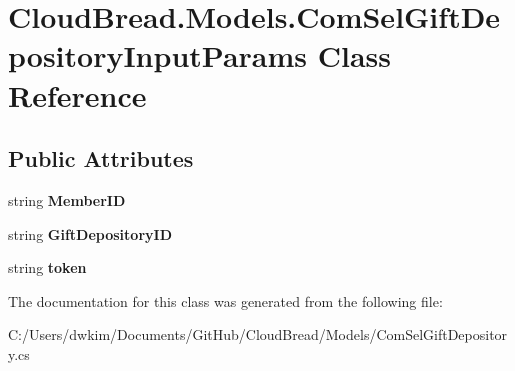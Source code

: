 \hypertarget{a00054}{}\section{Cloud\+Bread.\+Models.\+Com\+Sel\+Gift\+Depository\+Input\+Params Class Reference}
\label{a00054}
\subsection*{Public Attributes}
\begin{DoxyCompactItemize}
\item 
string {\bfseries Member\+ID}\hypertarget{a00054_acbe64b4f10384a97b625930589a03b95}{}\label{a00054_acbe64b4f10384a97b625930589a03b95}

\item 
string {\bfseries Gift\+Depository\+ID}\hypertarget{a00054_a2102851db1dc7a7a8080ad36fc16eef3}{}\label{a00054_a2102851db1dc7a7a8080ad36fc16eef3}

\item 
string {\bfseries token}\hypertarget{a00054_ad6aba426bef607419382284c00d2d3dc}{}\label{a00054_ad6aba426bef607419382284c00d2d3dc}

\end{DoxyCompactItemize}


The documentation for this class was generated from the following file\+:\begin{DoxyCompactItemize}
\item 
C\+:/\+Users/dwkim/\+Documents/\+Git\+Hub/\+Cloud\+Bread/\+Models/Com\+Sel\+Gift\+Depository.\+cs\end{DoxyCompactItemize}
